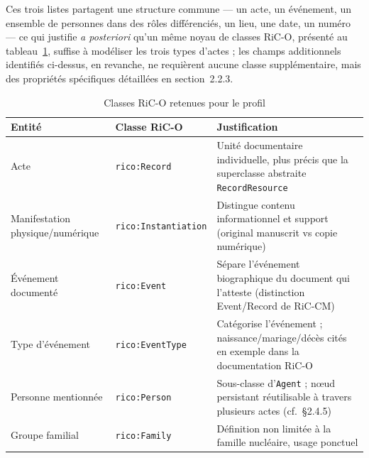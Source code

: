 Ces trois listes partagent une structure commune --- un acte, un événement, un ensemble de personnes dans des rôles différenciés, un lieu, une date, un numéro --- ce qui justifie \textit{a posteriori} qu'un même noyau de classes RiC-O, présenté au tableau~\ref{tab:classes-rico}, suffise à modéliser les trois types d'actes ; les champs additionnels identifiés ci-dessus, en revanche, ne requièrent aucune classe supplémentaire, mais des propriétés spécifiques détaillées en section~2.2.3.

\begin{table}[htbp]
    \centering
    \small
    \caption{Classes RiC-O retenues pour le profil}
    \label{tab:classes-rico}
    \begin{tabularx}{\textwidth}{
            >{\raggedright\arraybackslash\hsize=0.8\hsize}X
            >{\raggedright\arraybackslash\hsize=0.9\hsize}X
            >{\raggedright\arraybackslash\hsize=1.3\hsize}X
        }
        \toprule
        \textbf{Entité}                  & \textbf{Classe RiC-O}                               & \textbf{Justification}                                                                                  \\
        \midrule
        Acte                             & \texttt{rico:Record}                                & Unité documentaire individuelle, plus précis que la superclasse abstraite \texttt{RecordResource}       \\
        \midrule
        Manifestation physique/numérique & \texttt{rico:Instantiation}                         & Distingue contenu informationnel et support (original manuscrit vs copie numérique)                     \\
        \midrule
        Événement documenté              & \texttt{rico:Event}                                 & Sépare l'événement biographique du document qui l'atteste (distinction Event/Record de RiC-CM)          \\
        \midrule
        Type d'événement                 & \texttt{rico:EventType}                             & Catégorise l'événement ; naissance/mariage/décès cités en exemple dans la documentation RiC-O           \\
        \midrule
        Personne mentionnée              & \texttt{rico:Person}                                & Sous-classe d'\texttt{Agent} ; nœud persistant réutilisable à travers plusieurs actes (cf.~\S2.4.5)     \\
        \midrule
        Groupe familial                  & \texttt{rico:Family}                                & Définition non limitée à la famille nucléaire, usage ponctuel                                           \\

\end{tabularx}
\end{table}
